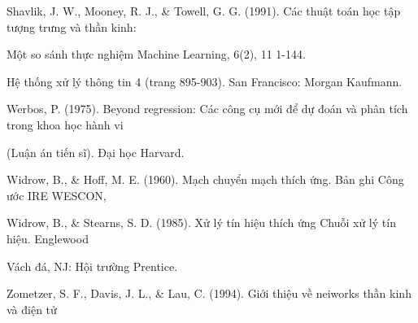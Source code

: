 Shavlik, J. W., Mooney, R. J., \& Towell, G. G. (1991). Các thuật toán học tập tượng trưng và thần kinh:

Một so sánh thực nghiệm Machine Learning, 6(2), 11 1-144.

Hệ thống xử lý thông tin 4 (trang 895-903). San Francisco: Morgan Kaufmann.

Werbos, P. (1975). Beyond regression: Các công cụ mới để dự đoán và phân tích trong khoa học hành vi

(Luận án tiến sĩ). Đại học Harvard.

Widrow, B., \& Hoff, M. E. (1960). Mạch chuyển mạch thích ứng. Bản ghi Công ước IRE WESCON,

Widrow, B., \& Stearns, S. D. (1985). Xử lý tín hiệu thích ứng Chuỗi xử lý tín hiệu. Englewood

Vách đá, NJ: Hội trường Prentice.

Zometzer, S. F., Davis, J. L., \& Lau, C. (1994). Giới thiệu về neiworks thần kinh và điện tử

